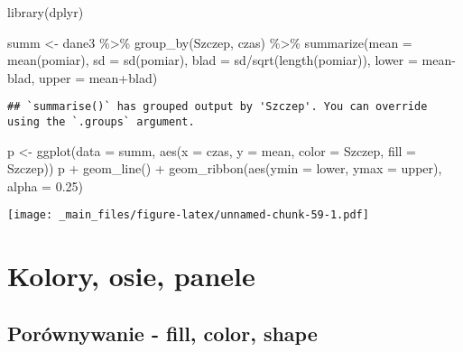 \documentclass[
]{book}
\newenvironment{Shaded}{\begin{snugshade}}{\end{snugshade}}
\newcommand{\AttributeTok}[1]{\textcolor[rgb]{0.77,0.63,0.00}{#1}}
\newcommand{\FloatTok}[1]{\textcolor[rgb]{0.00,0.00,0.81}{#1}}
\newcommand{\FunctionTok}[1]{\textcolor[rgb]{0.00,0.00,0.00}{#1}}
\newcommand{\NormalTok}[1]{#1}
\newcommand{\OtherTok}[1]{\textcolor[rgb]{0.56,0.35,0.01}{#1}}
\newcommand{\SpecialCharTok}[1]{\textcolor[rgb]{0.00,0.00,0.00}{#1}}
\begin{document}
\begin{Shaded}
\begin{Highlighting}[]
\FunctionTok{library}\NormalTok{(dplyr)}

\NormalTok{summ }\OtherTok{\textless{}{-}}\NormalTok{ dane3 }\SpecialCharTok{\%\textgreater{}\%} \FunctionTok{group\_by}\NormalTok{(Szczep, czas) }\SpecialCharTok{\%\textgreater{}\%} 
  \FunctionTok{summarize}\NormalTok{(}\AttributeTok{mean =} \FunctionTok{mean}\NormalTok{(pomiar), }
            \AttributeTok{sd =} \FunctionTok{sd}\NormalTok{(pomiar), }
            \AttributeTok{blad =}\NormalTok{ sd}\SpecialCharTok{/}\FunctionTok{sqrt}\NormalTok{(}\FunctionTok{length}\NormalTok{(pomiar)), }
            \AttributeTok{lower =}\NormalTok{ mean}\SpecialCharTok{{-}}\NormalTok{blad, }
            \AttributeTok{upper =}\NormalTok{ mean}\SpecialCharTok{+}\NormalTok{blad)}
\end{Highlighting}
\end{Shaded}

\begin{verbatim}
## `summarise()` has grouped output by 'Szczep'. You can override using the `.groups` argument.
\end{verbatim}

\begin{Shaded}
\begin{Highlighting}[]
\NormalTok{p }\OtherTok{\textless{}{-}} \FunctionTok{ggplot}\NormalTok{(}\AttributeTok{data =}\NormalTok{ summ, }\FunctionTok{aes}\NormalTok{(}\AttributeTok{x =}\NormalTok{ czas, }\AttributeTok{y =}\NormalTok{ mean, }\AttributeTok{color =}\NormalTok{ Szczep, }\AttributeTok{fill =}\NormalTok{ Szczep))}
\NormalTok{p }\SpecialCharTok{+} \FunctionTok{geom\_line}\NormalTok{() }\SpecialCharTok{+} \FunctionTok{geom\_ribbon}\NormalTok{(}\FunctionTok{aes}\NormalTok{(}\AttributeTok{ymin =}\NormalTok{ lower, }\AttributeTok{ymax =}\NormalTok{ upper), }\AttributeTok{alpha =} \FloatTok{0.25}\NormalTok{)}
\end{Highlighting}
\end{Shaded}

\texttt{[image: \_main\_files/figure-latex/unnamed-chunk-59-1.pdf]}

\hypertarget{kolory-osie-panele}{%
\section{Kolory, osie, panele}\label{kolory-osie-panele}}

\hypertarget{poruxf3wnywanie---fill-color-shape}{%
\subsection{Porównywanie - fill, color, shape}\label{poruxf3wnywanie---fill-color-shape}}
\end{document}
